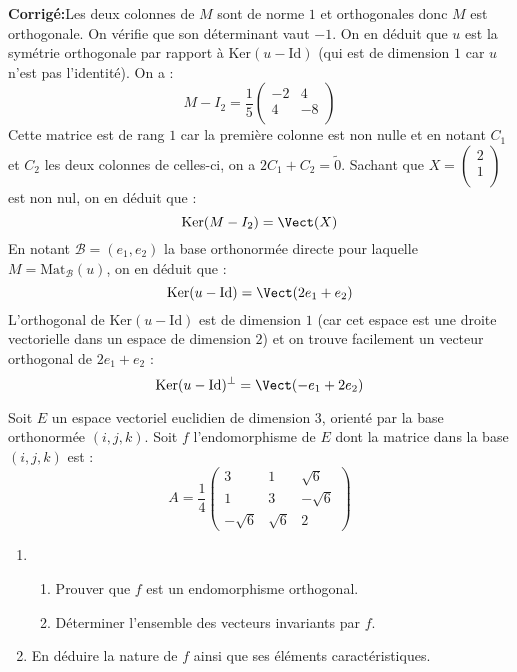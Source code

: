 \documentclass[a4paper,twoside,french,11pt]{VcCours}
\newcommand{\corr}{\textbf{Corrigé:}}
\begin{document}
\corr Les deux colonnes de $M$ sont de norme $1$ et orthogonales donc $M$ est orthogonale. On vérifie que son déterminant vaut $-1$. On en déduit que $u$ est la symétrie orthogonale par rapport à $\textrm{Ker}(u- \textrm{Id})$ (qui est de dimension $1$ car $u$ n'est pas l'identité). On a :
$$ M- I_2 = \dfrac{1}{5} \begin{pmatrix}
-2 & 4 \\
4 & -8 \\
\end{pmatrix}$$
Cette matrice est de rang $1$ car la première colonne est non nulle et en notant $C_1$ et $C_2$ les deux colonnes de celles-ci, on a $2C_1+C_2= \tilde{0}$. Sachant que $X=\begin{pmatrix}
2 \\
1 \\
\end{pmatrix}$ est non nul, on en déduit que :
$$ \textrm{Ker}(M-I_2) = \Vect(X)$$
En notant $\mathcal{B}=(e_1,e_2)$ la base orthonormée directe pour laquelle $M= \textrm{Mat}_{\mathcal{B}}(u)$, on en déduit que :
$$ \textrm{Ker}(u- \textrm{Id}) = \Vect(2e_1+e_2)$$
L'orthogonal de  $\textrm{Ker}(u- \textrm{Id})$ est de dimension $1$ (car cet espace est une droite vectorielle dans un espace de dimension $2$) et on trouve facilement un vecteur orthogonal de $2e_1+e_2$ :
$$  \textrm{Ker}(u- \textrm{Id})^{\perp} =  \Vect(-e_1+2e_2)$$




\begin{Exercice}{} Soit $E$ un espace vectoriel euclidien de dimension 3, orienté par la base orthonormée $(i,j,k)$. Soit $f$ l'endomorphisme de $E$ dont la matrice dans la base $(i,j,k)$ est :
$$A=\dfrac{1}{4}\begin{pmatrix}
3&1&\sqrt{6}\\
1&3&-\sqrt{6}\\
-\sqrt{6}&\sqrt{6}&2
\end{pmatrix}$$
\begin{enumerate}
\item
\begin{enumerate}
\item 
Prouver que $f$ est un endomorphisme orthogonal.
\item
Déterminer l'ensemble des vecteurs invariants par $f$.
\end{enumerate}
\item
En déduire la nature de $f$ ainsi que ses éléments caractéristiques.
\end{enumerate}
\end{Exercice}
\end{document}
